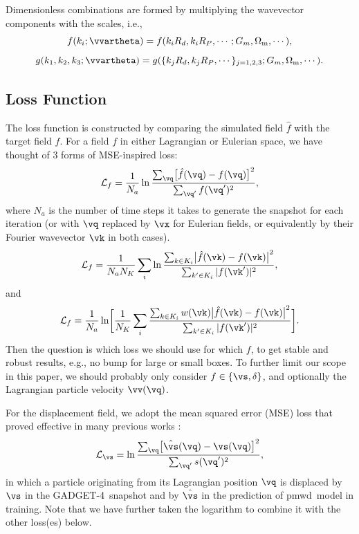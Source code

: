 \documentclass[modern, trackchanges, dvipsnames]{aastex631}
\newcommand{\pmwd}{{\usefont{T1}{nova}{m}{sl}pmwd}}
\newcommand{\GADGET}{{{\fontsize{10pt}{12pt}\selectfont GADGET}-4}}
\newcommand{\cL}{\mathcal{L}}
\newcommand{\Omegam}{\Omega_\mathrm{m}}
\newcommand{\YL}[1]{\textcolor{Bittersweet}{#1}}
\begin{document}
Dimensionless combinations are formed by multiplying the wavevector components
with the scales, i.e.,
%
\begin{equation}
f(k_i; \vvartheta) = f(k_iR_d, k_iR_P, \cdots; G_m, \Omegam, \cdots),
\end{equation}
%
\begin{equation}
g(k_1, k_2, k_3; \vvartheta) = g(\{k_jR_d, k_jR_P, \cdots\}_{j=1,2,3}; G_m, \Omegam, \cdots).
\end{equation}
%


\vspace{1em}
\subsection{Loss Function}
\label{sec:loss}

The loss function is constructed by comparing the simulated field $\hat f$ with
the target field $f$.
\YL{
For a field $f$ in either Lagrangian or Eulerian space, we have thought
of 3 forms of MSE-inspired loss:
%
\begin{equation}
\cL_f = \frac1{N_a} \ln
  \frac{\sum_\vq \bigl[ \hat f(\vq) - f(\vq) \bigr]^2}
       {\sum_{\vq'} f(\vq')^2},
\end{equation}
%
where $N_a$ is the number of time steps it takes to generate the snapshot for
each iteration
(or with $\vq$ replaced by $\vx$ for Eulerian fields, or equivalently by
their Fourier wavevector $\vk$ in both cases).
%
\begin{equation}
\cL_f = \frac1{N_a N_K} \sum_i \ln
\frac{\sum_{k \in K_i} \bigl| \hat f(\vk) - f(\vk) \bigr|^2}
     {\sum_{k' \in K_i} | f(\vk')|^2},
\end{equation}
%
and
%
\begin{equation}
\cL_f = \frac1{N_a} \ln \biggl[ \frac1{N_K} \sum_i
\frac{\sum_{k \in K_i} w(\vk)
      \bigl| \hat f(\vk) - f(\vk) \bigr|^2}
     {\sum_{k' \in K_i} |f(\vk')|^2} \biggl].
\end{equation}
%
Then the question is which loss we should use for which $f$, to get
stable and robust results, e.g., no bump for large or small boxes.
To further limit our scope in this paper, we should probably only
consider $f \in \{\vs, \delta\}$, and optionally the Lagrangian particle
velocity $\vv(\vq)$.
}

For the displacement field, we adopt the mean squared error (MSE) loss
that proved effective in many previous works
\citep[e.g.,][]{HeEtAl2019, LiEtAl2021}:
%
\begin{equation}
\cL_\vs = \ln \frac{\sum_\vq \bigl[ \hat\vs(\vq) - \vs(\vq) \bigr]^2}
                   {\sum_{\vq'} s(\vq')^2},
\end{equation}
%
in which a particle originating from its Lagrangian position $\vq$ is
displaced by $\vs$ in the \GADGET\ snapshot and by $\hat\vs$ in the
prediction of \pmwd\ model in training.
Note that we have further taken the logarithm to combine it with the
other loss(es) below.
\end{document}
